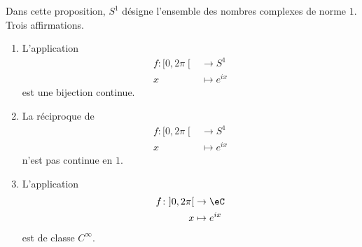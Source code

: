 \begin{proposition}		\label{PROPooXELTooYKjDav}
	Dans cette proposition, \( S^1\) désigne l'ensemble des nombres complexes de norme \( 1\). Trois affirmations.
	\begin{enumerate}
		\item		\label{ITEMooOHRHooRXvxrL}
		      L'application
		      \begin{equation}
			      \begin{aligned}
				      f\colon \mathopen[ 0 , 2\pi \mathclose[ & \to S^1         \\
				      x                                       & \mapsto  e^{ix}
			      \end{aligned}
		      \end{equation}
		      est une bijection continue.
		\item		\label{ITEMooPWUWooHsQBDg}
		      La réciproque de
		      \begin{equation}
			      \begin{aligned}
				      f\colon \mathopen[ 0 , 2\pi \mathclose[ & \to S^1         \\
				      x                                       & \mapsto  e^{ix}
			      \end{aligned}
		      \end{equation}
		      n'est pas continue en \( 1\).
		\item		\label{ITEMooCVAQooLsYspI}
		      L'application
		      \begin{equation}
			      \begin{aligned}
				      f\colon \mathopen] 0 , 2\pi \mathclose[ & \to \eC         \\
				      x                                       & \mapsto  e^{ix}
			      \end{aligned}
		      \end{equation}
		      est de classe \( C^{\infty}\).
	\end{enumerate}
\end{proposition}

